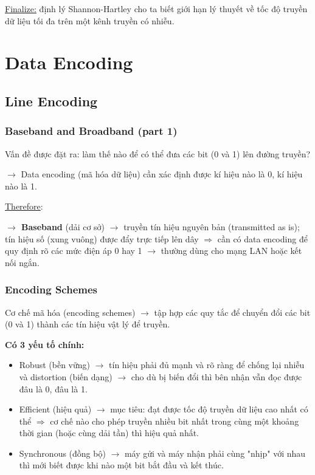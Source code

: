 \noindent
\underline{Finalize:} định lý Shannon-Hartley cho ta biết giới hạn lý thuyết về tốc độ truyền dữ liệu tối đa trên một kênh truyền có nhiễu.
\medskip

\section{Data Encoding}

\subsection{Line Encoding}

\subsubsection{Baseband and Broadband (part 1)}

\noindent
Vấn đề được đặt ra: làm thế nào để có thể đưa các bit (0 và 1) lên đường truyền?

$\rightarrow$ Data encoding (mã hóa dữ liệu) cần xác định được kí hiệu nào là 0, kí hiệu nào là 1.
\medskip

\noindent
\underline{Therefore}:

\textbf{$\rightarrow$ Baseband} (dải cơ sở) $\rightarrow$ truyền tín hiệu nguyên bản (transmitted as is); tín hiệu số (xung vuông) được đẩy trực tiếp lên dây $\Rightarrow$ cần có data encoding để quy định rõ các mức điện áp 0 hay 1 $\rightarrow$ thường dùng cho mạng LAN hoặc kết nối ngắn.
\medskip

\subsubsection{Encoding Schemes}

\noindent
Cơ chế mã hóa (encoding schemes) $\rightarrow$ tập hợp các quy tắc để chuyển đổi các bit (0 và 1) thành các tín hiệu vật lý để truyền.
\medskip

\noindent
\textbf{Có 3 yếu tố chính:}

\begin{itemize}
    \item Robust (bền vững) $\rightarrow$ tín hiệu phải đủ mạnh và rõ ràng để chống lại nhiễu và distortion (biến dạng) $\rightarrow$ cho dù bị biến đổi thì bên nhận vẫn đọc được đâu là 0, đâu là 1.
    \item Efficient (hiệu quả) $\rightarrow$ mục tiêu: đạt được tốc độ truyền dữ liệu cao nhất có thể $\Rightarrow$ cơ chế nào cho phép truyền nhiều bit nhất trong cùng một khoảng thời gian (hoặc cùng dải tần) thì hiệu quả nhất.
    \item Synchronous (đồng bộ) $\rightarrow$ máy gửi và máy nhận phải cùng "nhịp" với nhau thì mới biết được khi nào một bit bắt đầu và kết thúc.
\end{itemize}

